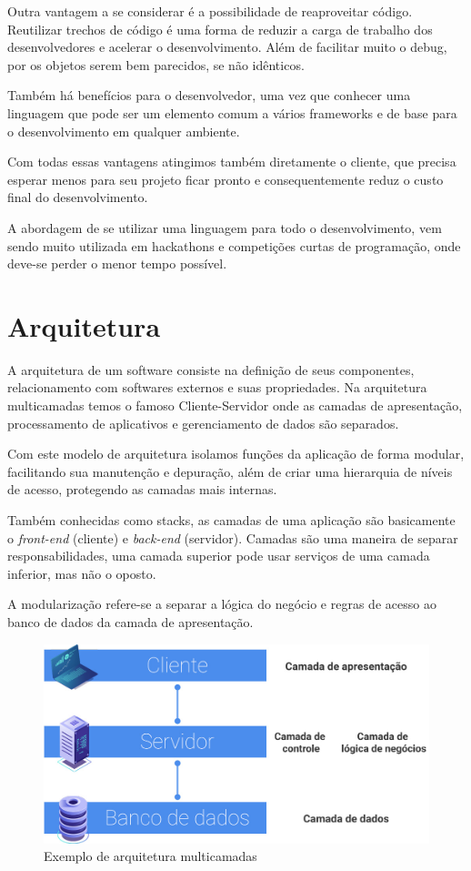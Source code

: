 \documentclass[
	12pt,				%
	openright,			%
	twoside,			%
	a4paper,			%
	english,			%
	brazil				%
	]{abntex2}
\begin{document}
Outra vantagem a se considerar é a possibilidade de reaproveitar código. Reutilizar trechos de código é uma forma de reduzir a carga de trabalho dos desenvolvedores e acelerar o desenvolvimento. Além de facilitar muito o debug, por os objetos serem bem parecidos, se não idênticos.

Também há benefícios para o desenvolvedor, uma vez que conhecer uma linguagem que pode ser um elemento comum a vários frameworks e de base para o desenvolvimento em qualquer ambiente.

Com todas essas vantagens atingimos também diretamente o cliente, que precisa esperar menos para seu projeto ficar pronto e consequentemente reduz o custo final do desenvolvimento.

A abordagem de se utilizar uma linguagem para todo o desenvolvimento, vem sendo muito utilizada em hackathons e competições curtas de programação, onde deve-se perder o menor tempo possível.

\section{Arquitetura}
\label{sec:Arquitetura}

A arquitetura de um software consiste na definição de seus componentes, relacionamento com softwares externos e suas propriedades. Na arquitetura multicamadas temos o famoso Cliente-Servidor onde as camadas de apresentação, processamento de aplicativos e gerenciamento de dados são separados.

Com este modelo de arquitetura isolamos funções da aplicação de forma modular, facilitando sua manutenção e depuração, além de criar uma hierarquia de níveis de acesso, protegendo as camadas mais internas.

Também conhecidas como stacks, as camadas de uma aplicação são basicamente o \textit{front-end} (cliente) e \textit{back-end} (servidor). Camadas são uma maneira de separar responsabilidades, uma camada superior pode usar serviços de uma camada inferior, mas não o oposto. 

A modularização refere-se a separar a lógica do negócio e regras de acesso ao banco de dados da camada de apresentação.

\begin{figure}[h]
	\centering

	\caption{Exemplo de arquitetura multicamadas} \label{fig:MultilayerArchitecture}
    \includegraphics[scale=0.4]{multilayer-architecture}

\end{figure}
\end{document}
